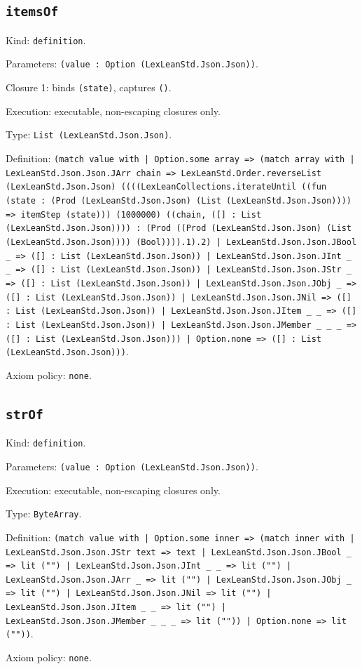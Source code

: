 \documentclass[11pt]{article}
\begin{document}
\subsection*{\texttt{itemsOf}}
\noindent Kind: \texttt{definition}.\par
\noindent Parameters: \texttt{(value : Option (LexLeanStd.Json.Json))}.\par
\noindent Closure 1: binds \texttt{(state)}, captures \texttt{()}.\par
\noindent Execution: executable, non-escaping closures only.\par
\noindent Type: \texttt{List (LexLeanStd.Json.Json)}.\par
\noindent Definition: \texttt{(match value with | Option.some array => (match array with | LexLeanStd.Json.Json.JArr chain => LexLeanStd.Order.reverseList (LexLeanStd.Json.Json) ((((LexLeanCollections.iterateUntil ((fun (state : (Prod (LexLeanStd.Json.Json) (List (LexLeanStd.Json.Json)))) => itemStep (state))) (1000000) ((chain, ([] : List (LexLeanStd.Json.Json)))) : (Prod ((Prod (LexLeanStd.Json.Json) (List (LexLeanStd.Json.Json)))) (Bool)))).1).2) | LexLeanStd.Json.Json.JBool \_ => ([] : List (LexLeanStd.Json.Json)) | LexLeanStd.Json.Json.JInt \_ \_ => ([] : List (LexLeanStd.Json.Json)) | LexLeanStd.Json.Json.JStr \_ => ([] : List (LexLeanStd.Json.Json)) | LexLeanStd.Json.Json.JObj \_ => ([] : List (LexLeanStd.Json.Json)) | LexLeanStd.Json.Json.JNil => ([] : List (LexLeanStd.Json.Json)) | LexLeanStd.Json.Json.JItem \_ \_ => ([] : List (LexLeanStd.Json.Json)) | LexLeanStd.Json.Json.JMember \_ \_ \_ => ([] : List (LexLeanStd.Json.Json))) | Option.none => ([] : List (LexLeanStd.Json.Json)))}.\par
\noindent Axiom policy: \texttt{none}.\par
\subsection*{\texttt{strOf}}
\noindent Kind: \texttt{definition}.\par
\noindent Parameters: \texttt{(value : Option (LexLeanStd.Json.Json))}.\par
\noindent Execution: executable, non-escaping closures only.\par
\noindent Type: \texttt{ByteArray}.\par
\noindent Definition: \texttt{(match value with | Option.some inner => (match inner with | LexLeanStd.Json.Json.JStr text => text | LexLeanStd.Json.Json.JBool \_ => lit ("") | LexLeanStd.Json.Json.JInt \_ \_ => lit ("") | LexLeanStd.Json.Json.JArr \_ => lit ("") | LexLeanStd.Json.Json.JObj \_ => lit ("") | LexLeanStd.Json.Json.JNil => lit ("") | LexLeanStd.Json.Json.JItem \_ \_ => lit ("") | LexLeanStd.Json.Json.JMember \_ \_ \_ => lit ("")) | Option.none => lit (""))}.\par
\noindent Axiom policy: \texttt{none}.\par
\end{document}
